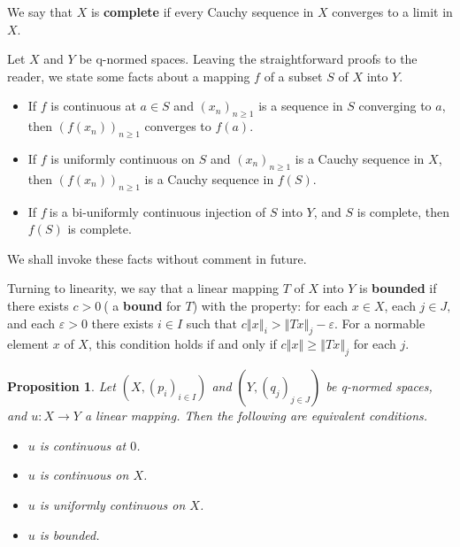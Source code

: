 \documentclass[11pt]{article}%
\newtheorem{proposition}[theorem]{Proposition}
\begin{document}
%

\noindent
We say that $X$ is \textbf{complete} if every Cauchy sequence in $X$ converges
to a limit in $X$.

Let $X$ and $Y$ be q-normed spaces. Leaving the straightforward proofs to the
reader, we state some facts about a mapping $f$ of a subset $S$ of $X$ into
$Y$.

\begin{itemize}
\item[--] If $f$ is continuous at $a\in S$ and $\left(  x_{n}\right)
_{n\geq1}$ is a sequence in $S$ converging to $a$, then $\left(
f(x_{n})\right)  _{n\geq1}$ converges to $f(a)$.

\item[--] If $f$ is uniformly continuous on $S$ and $\left(  x_{n}\right)
_{n\geq1}$ is a Cauchy sequence in $X$, then $\left(  f(x_{n})\right)
_{n\geq1}$ is a Cauchy sequence in $f(S)$.

\item[--] If $f\ $is a bi-uniformly continuous injection of $S$ into $Y$, and
$S$ is complete, then $f(S)$ is complete.
\end{itemize}

%

\noindent
We shall invoke these facts without comment in future.%

\medskip


Turning to linearity, we say that a linear mapping $T$ of $X$ into $Y$ is
\textbf{bounded} if there exists $c>0~$( a \textbf{bound} for $T$) with the
property: for each $x\in X$, each $j\in J,$ and each $\varepsilon>0$ there
exists $i\in I$ such that $c\left\Vert x\right\Vert _{i}>\left\Vert
Tx\right\Vert _{j}-\varepsilon$. For a normable element $x$ of $X$, this
condition holds if and only if $c\left\Vert x\right\Vert \geq\left\Vert
Tx\right\Vert _{j}$ for each $j$.

\begin{proposition}
\label{feb13p1}Let $\left(  X,\left(  p_{i}\right)  _{i\in I}\right)  $ and
$\left(  Y,\left(  q_{j}\right)  _{j\in J}\right)  $ be q-normed spaces, and
$u:X\rightarrow Y$ a linear mapping. Then the following are equivalent conditions.

\begin{itemize}
\item[\emph{(i)}] $u$ is continuous at $0$.

\item[\emph{(ii)}] $u$ is continuous on $X$.

\item[\emph{(iii)}] $u$ is uniformly continuous on $X$.

\item[\emph{(iv)}] $u$ is bounded.
\end{itemize}
\end{proposition}
\end{document}
